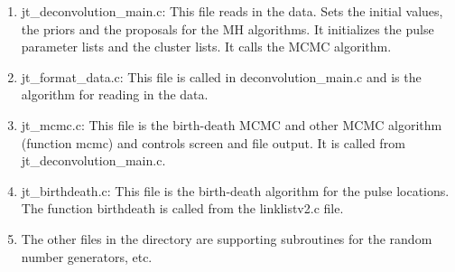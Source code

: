 \documentclass[12pt, oneside]{article}   	%
\begin{document}
\begin{enumerate}
\item jt\_deconvolution\_main.c: This file reads in the data. Sets the initial values, the priors and the proposals for the MH algorithms. It initializes the pulse parameter lists and the cluster lists.  It calls the MCMC algorithm.
\item jt\_format\_data.c: This file is called in deconvolution\_main.c and is the algorithm for reading in the data.
\item jt\_mcmc.c: This file is the birth-death MCMC and other MCMC algorithm (function mcmc) and controls screen and file output. It is called from jt\_deconvolution\_main.c.
\item jt\_birthdeath.c: This file is the birth-death algorithm for the pulse locations.  The function birthdeath is called from the linklistv2.c file.
\item The other files in the directory are supporting subroutines for the random number generators, etc.
\end{enumerate}
\end{document}
